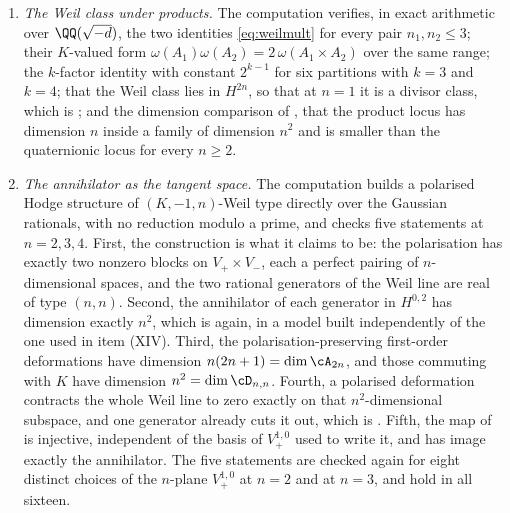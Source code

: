 \begin{enumerate}[label=\textup{(\Roman*)},leftmargin=*]
\item \emph{The Weil class under products.} The computation verifies, in
  exact arithmetic over $\QQ(\sqrt{-d})$, the two identities \eqref{eq:weilmult} for every pair
  $n_{1},n_{2}\le3$; their $K$-valued form
  $\omega(A_{1})\omega(A_{2})=2\,\omega(A_{1}\times A_{2})$ over the same
  range; the $k$-factor identity with constant $2^{k-1}$ for six partitions
  with $k=3$ and $k=4$; that the Weil class lies in $H^{2n}$, so that at
  $n=1$ it is a divisor class, which is ; and the
  dimension comparison of , that the product locus has
  dimension $n$ inside a family of dimension $n^{2}$ and is smaller than the
  quaternionic locus for every $n\ge2$.

\item \emph{The annihilator as the tangent space.} The computation builds a
  polarised Hodge structure of $(K,-1,n)$-Weil type directly over the
  Gaussian rationals, with no reduction modulo a prime, and checks five
  statements at $n=2,3,4$. First, the construction is what it claims to be:
  the polarisation has exactly two nonzero blocks on $V_{+}\times V_{-}$,
  each a perfect pairing of $n$-dimensional spaces, and the two rational
  generators of the Weil line are real of type $(n,n)$. Second, the
  annihilator of each generator in $H^{0,2}$ has dimension exactly $n^{2}$,
  which is  again, in a model built independently of
  the one used in item (XIV). Third, the polarisation-preserving first-order
  deformations have dimension $n(2n+1)=\dim\cA_{2n}$, and those commuting
  with $K$ have dimension $n^{2}=\dim\cD_{n,n}$. Fourth, a polarised
  deformation contracts the whole Weil line to zero exactly on that
  $n^{2}$-dimensional subspace, and one generator already cuts it out, which
  is . Fifth, the map of  is
  injective, independent of the basis of $V_{+}^{1,0}$ used to write it, and
  has image exactly the annihilator. The five statements are checked again
  for eight distinct choices of the $n$-plane $V_{+}^{1,0}$ at $n=2$ and at
  $n=3$, and hold in all sixteen.


\end{enumerate}
